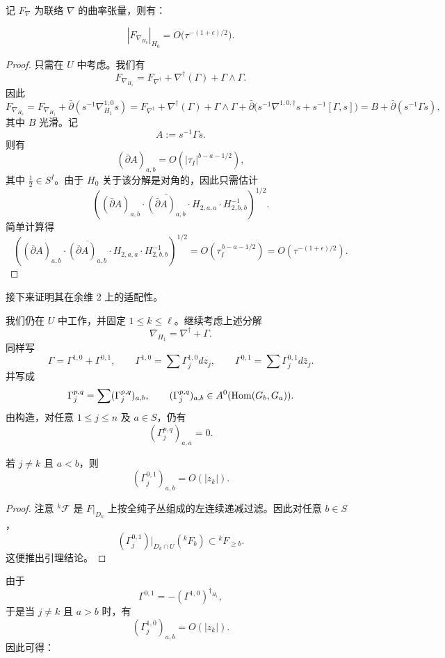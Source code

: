 记 \(F_\nabla\) 为联络 \(\nabla\) 的曲率张量，则有：

\begin{lemma}
\[
|F_{\nabla_{H_0}}|_{H_0}=O\bigl(\tau^{-(1+\epsilon)/2}\bigr).
\]
\end{lemma}

\begin{proof}
只需在 \(U\) 中考虑。我们有
\[
F_{\nabla_{H_1}}
=
F_{\nabla^\dagger}
+\nabla^\dagger(\Gamma)
+\Gamma\wedge \Gamma.
\]
因此
\[
F_{\nabla_{H_0}}
=
F_{\nabla_{H_1}}
+\bar\partial(s^{-1}\nabla^{1,0}_{H_1}s)
=
F_{\nabla^\dagger}
+\nabla^\dagger(\Gamma)
+\Gamma\wedge \Gamma
+\bar\partial\bigl(s^{-1}\nabla^{1,0,\dagger}s+s^{-1}[\Gamma,s]\bigr)
=
B+\bar\partial(s^{-1}\Gamma s),
\]
其中 \(B\) 光滑。记
\[
A:=s^{-1}\Gamma s.
\]
则有
\[
(\bar\partial A)_{a,b}=O(|\tau_I|^{b-a-1/2}),
\]
其中 \(\frac12\in S^I\)。由于 \(H_0\) 关于该分解是对角的，因此只需估计
\[
\left(
(\bar\partial A)_{a,b}\cdot \overline{(\bar\partial A)_{a,b}}\cdot H_{2,a,a}\cdot H_{2,b,b}^{-1}
\right)^{1/2}.
\]
简单计算得
\[
\left(
(\bar\partial A)_{a,b}\cdot \overline{(\bar\partial A)_{a,b}}\cdot H_{2,a,a}\cdot H_{2,b,b}^{-1}
\right)^{1/2}
=
O(\tau_I^{\,b-a-1/2})
=
O(\tau^{-(1+\epsilon)/2}).
\]
\end{proof}

接下来证明其在余维 2 上的适配性。

我们仍在 \(U\) 中工作，并固定 \(1\le k\le \ell\)。继续考虑上述分解
\[
\nabla_{H_1}=\nabla^\dagger+\Gamma.
\]
同样写
\[
\Gamma=\Gamma^{1,0}+\Gamma^{0,1},
\qquad
\Gamma^{1,0}=\sum \Gamma_j^{1,0}dz_j,\qquad
\Gamma^{0,1}=\sum \Gamma_j^{0,1}d\bar z_j.
\]
并写成
\[
\Gamma_j^{p,q}=\sum (\Gamma_j^{p,q})_{a,b},
\qquad
(\Gamma_j^{p,q})_{a,b}\in A^0(\operatorname{Hom}(G_b,G_a)).
\]
由构造，对任意 \(1\le j\le n\) 及 \(a\in S\)，仍有
\[
(\Gamma_j^{p,q})_{a,a}=0.
\]

\begin{lemma}
若 \(j\ne k\) 且 \(a<b\)，则
\[
(\Gamma_j^{0,1})_{a,b}=O(|z_k|).
\]
\end{lemma}

\begin{proof}
注意 \({}^k\mathcal F\) 是 \(F|_{D_k}\) 上按全纯子丛组成的左连续递减过滤。因此对任意 \(b\in S\)，
\[
(\Gamma_j^{0,1})|_{D_k\cap U}({}^kF_b)\subset {}^kF_{\ge b}.
\]
这便推出引理结论。
\end{proof}

由于
\[
\Gamma^{0,1}=-(\Gamma^{1,0})^{\dagger_{H_1}},
\]
于是当 \(j\ne k\) 且 \(a>b\) 时，有
\[
(\Gamma_j^{1,0})_{a,b}=O(|z_k|).
\]
因此可得：

